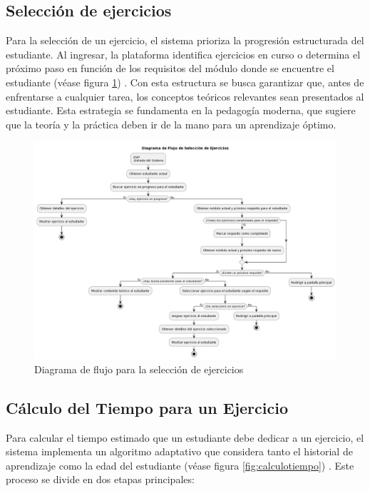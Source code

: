 \subsection{Selección de ejercicios}

Para la selección de un ejercicio, el sistema prioriza la progresión estructurada del estudiante. Al ingresar, la plataforma identifica ejercicios en curso o determina el próximo paso en función de los requisitos del módulo donde se encuentre el estudiante (véase figura \ref{fig:seleccion}) . Con esta estructura se busca garantizar que, antes de enfrentarse a cualquier tarea, los conceptos teóricos relevantes sean presentados al estudiante. Esta estrategia se fundamenta en la pedagogía moderna, que sugiere que la teoría y la práctica deben ir de la mano para un aprendizaje óptimo.

\begin{figure}[H]
\centering
\includegraphics[width=\textwidth]{imagenes/seleccionejercicios.png}
\caption{Diagrama de flujo para la selección de ejercicios}
\label{fig:seleccion}
\end{figure}

\subsection{Cálculo del Tiempo para un Ejercicio}

Para calcular el tiempo estimado que un estudiante debe dedicar a un ejercicio, el sistema implementa un algoritmo adaptativo que considera tanto el historial de aprendizaje como la edad del estudiante (véase figura \ref{fig:calculotiempo}) . Este proceso se divide en dos etapas principales:


